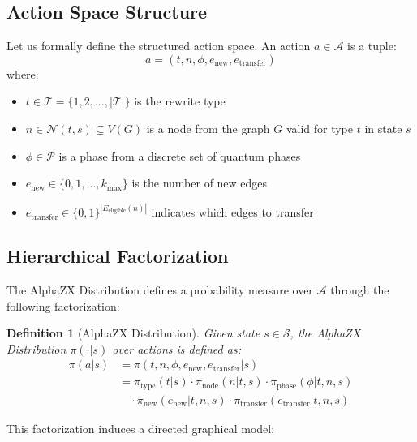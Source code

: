 \documentclass[11pt,a4paper]{article}
\newtheorem{definition}{Definition}
\newcommand{\cA}{\mathcal{A}}
\newcommand{\cS}{\mathcal{S}}
\newcommand{\cT}{\mathcal{T}}
\newcommand{\cN}{\mathcal{N}}
\newcommand{\cP}{\mathcal{P}}
\begin{document}
\subsection{Action Space Structure}

Let us formally define the structured action space. An action $a \in \cA$ is a tuple:
\[
a = (t, n, \phi, e_{\text{new}}, e_{\text{transfer}})
\]
where:
\begin{itemize}
    \item $t \in \cT = \{1, 2, \ldots, |\cT|\}$ is the rewrite type
    \item $n \in \cN(t, s) \subseteq V(G)$ is a node from the graph $G$ valid for type $t$ in state $s$
    \item $\phi \in \cP$ is a phase from a discrete set of quantum phases
    \item $e_{\text{new}} \in \{0, 1, \ldots, k_{\text{max}}\}$ is the number of new edges
    \item $e_{\text{transfer}} \in \{0,1\}^{|E_{\text{eligible}}(n)|}$ indicates which edges to transfer
\end{itemize}

\subsection{Hierarchical Factorization}

The AlphaZX Distribution defines a probability measure over $\cA$ through the following factorization:

\begin{definition}[AlphaZX Distribution]
Given state $s \in \cS$, the AlphaZX Distribution $\pi(\cdot|s)$ over actions is defined as:
\begin{align}
\pi(a|s) &= \pi(t, n, \phi, e_{\text{new}}, e_{\text{transfer}}|s) \\
&= \pi_{\text{type}}(t|s) \cdot \pi_{\text{node}}(n|t,s) \cdot \pi_{\text{phase}}(\phi|t,n,s) \\
&\quad \cdot \pi_{\text{new}}(e_{\text{new}}|t,n,s) \cdot \pi_{\text{transfer}}(e_{\text{transfer}}|t,n,s)
\end{align}
\end{definition}

This factorization induces a directed graphical model:

\begin{center}
\end{center}
\end{document}
